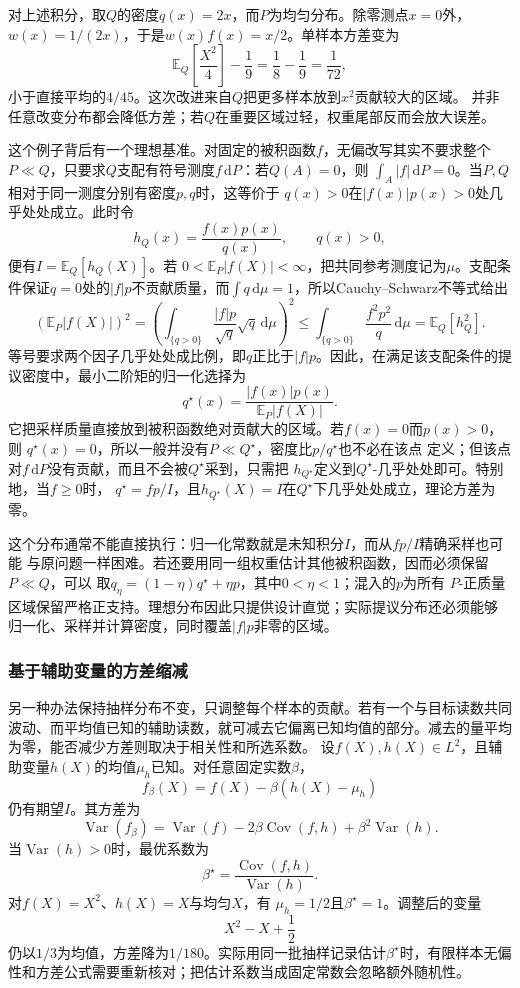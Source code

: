 对上述积分，取\(Q\)的密度\(q(x)=2x\)，而\(P\)为均匀分布。除零测点\(x=0\)外，\(w(x)=1/(2x)\)，于是\(w(x)f(x)=x/2\)。单样本方差变为
\[ \mathbb{E}_Q\left[\frac{X^2}{4}\right]-\frac19
  =\frac18-\frac19=\frac{1}{72}, \]
小于直接平均的\(4/45\)。这次改进来自\(Q\)把更多样本放到\(x^2\)贡献较大的区域。
并非任意改变分布都会降低方差；若\(Q\)在重要区域过轻，权重尾部反而会放大误差。

这个例子背后有一个理想基准。对固定的被积函数\(f\)，无偏改写其实不要求整个
\(P\ll Q\)，只要求\(Q\)支配有符号测度\(f\,\mathrm{d}P\)：若\(Q(A)=0\)，则
\(\int_A|f|\,\mathrm{d}P=0\)。当\(P,Q\)相对于同一测度分别有密度\(p,q\)时，这等价于
\(q(x)>0\)在\(|f(x)|p(x)>0\)处几乎处处成立。此时令
\[
  h_Q(x)=\frac{f(x)p(x)}{q(x)},\qquad q(x)>0,
\]
便有\(I=\mathbb{E}_Q[h_Q(X)]\)。若
\(0<\mathbb{E}_P|f(X)|<\infty\)，把共同参考测度记为\(\mu\)。支配条件保证\(q=0\)处的\(|f|p\)不贡献质量，而\(\int q\,\mathrm d\mu=1\)，所以Cauchy--Schwarz不等式给出
\[
  (\mathbb E_P|f(X)|)^2
  =\left(\int_{\{q>0\}}\frac{|f|p}{\sqrt q}\sqrt q\,\mathrm d\mu\right)^2
  \leq\int_{\{q>0\}}\frac{f^2p^2}{q}\,\mathrm d\mu
  =\mathbb E_Q[h_Q^2].
\]
等号要求两个因子几乎处处成比例，即\(q\)正比于\(|f|p\)。因此，在满足该支配条件的提议密度中，最小二阶矩的归一化选择为
\[
  q^\star(x)
  =
  \frac{|f(x)|p(x)}{\mathbb{E}_P|f(X)|}.
\]
它把采样质量直接放到被积函数绝对贡献大的区域。若\(f(x)=0\)而\(p(x)>0\)，则
\(q^\star(x)=0\)，所以一般并没有\(P\ll Q^\star\)，密度比\(p/q^\star\)也不必在该点
定义；但该点对\(f\,\mathrm{d}P\)没有贡献，而且不会被\(Q^\star\)采到，只需把
\(h_{Q^\star}\)定义到\(Q^\star\)-几乎处处即可。特别地，当\(f\geq0\)时，
\(q^\star=fp/I\)，且\(h_{Q^\star}(X)=I\)在\(Q^\star\)下几乎处处成立，理论方差为零。

这个分布通常不能直接执行：归一化常数就是未知积分\(I\)，而从\(fp/I\)精确采样也可能
与原问题一样困难。若还要用同一组权重估计其他被积函数，因而必须保留\(P\ll Q\)，可以
取\(q_\eta=(1-\eta)q^\star+\eta p\)，其中\(0<\eta<1\)；混入的\(p\)为所有
\(P\)-正质量区域保留严格正支持。理想分布因此只提供设计直觉；实际提议分布还必须能够
归一化、采样并计算密度，同时覆盖\(|f|p\)非零的区域。

\subsubsection{基于辅助变量的方差缩减}
另一种办法保持抽样分布不变，只调整每个样本的贡献。若有一个与目标读数共同波动、而平均值已知的辅助读数，就可减去它偏离已知均值的部分。减去的量平均为零，能否减少方差则取决于相关性和所选系数。
设\(f(X),h(X)\in L^2\)，且辅助变量\(h(X)\)的均值\(\mu_h\)已知。对任意固定实数\(\beta\)，
\[ f_\beta(X)
  =f(X)-\beta(h(X)-\mu_h) \]
仍有期望\(I\)。其方差为
\[ \operatorname{Var}(f_\beta)
  =\operatorname{Var}(f)-2\beta\operatorname{Cov}(f,h)+\beta^2\operatorname{Var}(h). \]
当\(\operatorname{Var}(h)>0\)时，最优系数为
\[ \beta^\star
  =\frac{\operatorname{Cov}(f,h)}{\operatorname{Var}(h)}. \]
对\(f(X)=X^2\)、\(h(X)=X\)与均匀\(X\)，有
\(\mu_h=1/2\)且\(\beta^\star=1\)。调整后的变量
\[ X^2-X+\frac12 \]
仍以\(1/3\)为均值，方差降为\(1/180\)。实际用同一批抽样记录估计\(\beta^\star\)时，有限样本无偏性和方差公式需要重新核对；把估计系数当成固定常数会忽略额外随机性。

